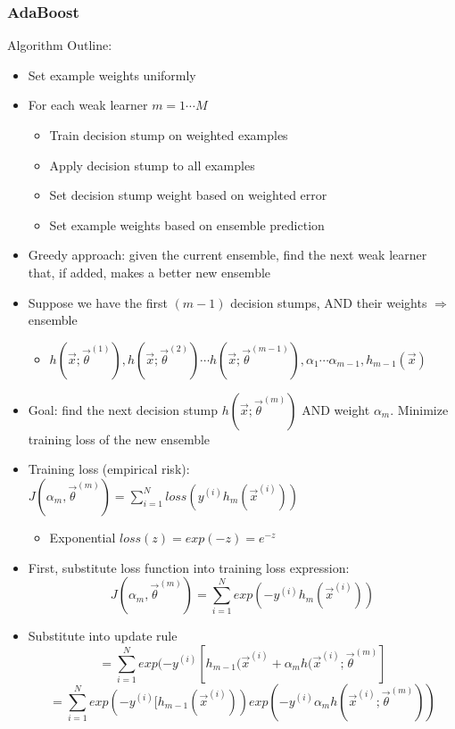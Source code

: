 \documentclass[10pt, oneside]{article}
\begin{document}
\subsubsection{AdaBoost}
Algorithm Outline:
\begin{itemize}
    \item Set example weights uniformly
    \item For each weak learner $m = 1 \cdots M$
    \begin{itemize}
        \item Train decision stump on weighted examples
        \item Apply decision stump to all examples
        \item Set decision stump weight based on weighted error
        \item Set example weights based on ensemble prediction
    \end{itemize}
    \item Greedy approach: given the current ensemble, find the next weak learner that, if added, makes a better new ensemble
    \item Suppose we have the first $(m-1)$ decision stumps, AND their weights $\Rightarrow$ ensemble
    \begin{itemize}
        \item $h(\vec x; \vec \theta^{(1)}), h(\vec x; \vec \theta^{(2)}) 
        \cdots h(\vec x; \vec \theta^{(m-1)}), \alpha_1 \cdots \alpha_{m-1}, h_{m-1} (\vec x)$
    \end{itemize}
    \item Goal: find the next decision stump $h(\vec x; \vec \theta^{(m)})$ AND weight $\alpha_m$. Minimize training loss of the new ensemble
    \item Training loss (empirical risk): $J(\alpha_m, \vec \theta^{(m)})=\sum_{i=1}^N loss \left(y^{(i)} h_m (\vec x^{(i)})\right)$
    \begin{itemize}
        \item Exponential $loss(z) = exp(-z) = e^{-z}$
    \end{itemize}
    \item First, substitute loss function into training loss expression:
    \[J(\alpha_m, \vec \theta^{(m)})=\sum_{i=1}^N exp \left(-y^{(i)} h_m (\vec x^{(i)})\right)\]
    \item Substitute into update rule
    \[=\sum_{i=1}^N exp(-y^{(i)}[h_{m-1}(\vec x^{(i)} + \alpha_m h(\vec x^{(i)}; \vec \theta ^{(m)}]\]
    \[=\sum_{i=1}^N exp(-y^{(i)}[h_{m-1}(\vec x^{(i)})) exp(-y^{(i)} \alpha_m h(\vec x^{(i)}; \vec \theta^{(m)}))\]

\end{itemize}
\end{document}

